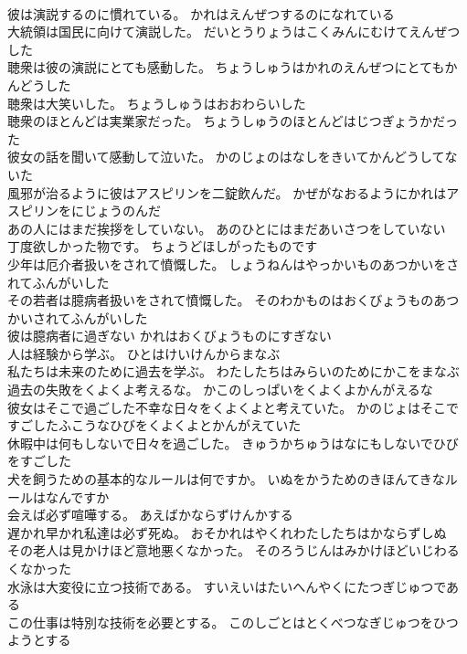 \documentclass[8pt]{extreport}
\begin{document}
\begin{CJK}{UTF8}{min}
\\	彼は演説するのに慣れている。	かれはえんぜつするのになれている 
\\	大統領は国民に向けて演説した。	だいとうりょうはこくみんにむけてえんぜつした 
\\	聴衆は彼の演説にとても感動した。	ちょうしゅうはかれのえんぜつにとてもかんどうした 
\\	聴衆は大笑いした。	ちょうしゅうはおおわらいした 
\\	聴衆のほとんどは実業家だった。	ちょうしゅうのほとんどはじつぎょうかだった 
\\	彼女の話を聞いて感動して泣いた。	かのじょのはなしをきいてかんどうしてないた 
\\	風邪が治るように彼はアスピリンを二錠飲んだ。	かぜがなおるようにかれはアスピリンをにじょうのんだ 
\\	あの人にはまだ挨拶をしていない。	あのひとにはまだあいさつをしていない 
\\	丁度欲しかった物です。	ちょうどほしがったものです 
\\	少年は厄介者扱いをされて憤慨した。	しょうねんはやっかいものあつかいをされてふんがいした 
\\	その若者は臆病者扱いをされて憤慨した。	そのわかものはおくびょうものあつかいされてふんがいした 
\\	彼は臆病者に過ぎない	かれはおくびょうものにすぎない 
\\	人は経験から学ぶ。	ひとはけいけんからまなぶ 
\\	私たちは未来のために過去を学ぶ。	わたしたちはみらいのためにかこをまなぶ 
\\	過去の失敗をくよくよ考えるな。	かこのしっぱいをくよくよかんがえるな 
\\	彼女はそこで過ごした不幸な日々をくよくよと考えていた。	かのじょはそこですごしたふこうなひびをくよくよとかんがえていた 
\\	休暇中は何もしないで日々を過ごした。	きゅうかちゅうはなにもしないでひびをすごした 
\\	犬を飼うための基本的なルールは何ですか。	いぬをかうためのきほんてきなルールはなんですか 
\\	会えば必ず喧嘩する。	あえばかならずけんかする 
\\	遅かれ早かれ私達は必ず死ぬ。	おそかれはやくれわたしたちはかならずしぬ 
\\	その老人は見かけほど意地悪くなかった。	そのろうじんはみかけほどいじわるくなかった 
\\	水泳は大変役に立つ技術である。	すいえいはたいへんやくにたつぎじゅつである 
\\	この仕事は特別な技術を必要とする。	このしごとはとくべつなぎじゅつをひつようとする 

\end{CJK}
\end{document}
